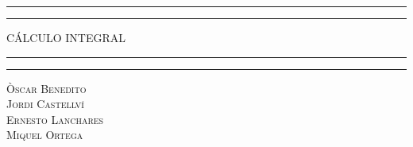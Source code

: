 \newcommand{\plogo}{\fbox{$\mathcal{PL}$}} %

\begin{titlepage} %

	\centering %

	\scshape %

	\vspace*{\baselineskip} %


	\rule{\textwidth}{1.6pt}\vspace*{-\baselineskip}\vspace*{2pt} %
	\rule{\textwidth}{0.4pt} %

	\vspace{0.75\baselineskip} %

	{\LARGE CÁLCULO INTEGRAL\\} %

	\vspace{0.75\baselineskip} %

	\rule{\textwidth}{0.4pt}\vspace*{-\baselineskip}\vspace{3.2pt} %
	\rule{\textwidth}{1.6pt} %

	\vspace{2\baselineskip} %



	\vspace*{3\baselineskip} %




	\vspace{1.5\baselineskip} %

	{\scshape\Large Òscar Benedito \\ Jordi Castellví \\ Ernesto Lanchares \\ Miquel Ortega \\} %


\end{titlepage}
